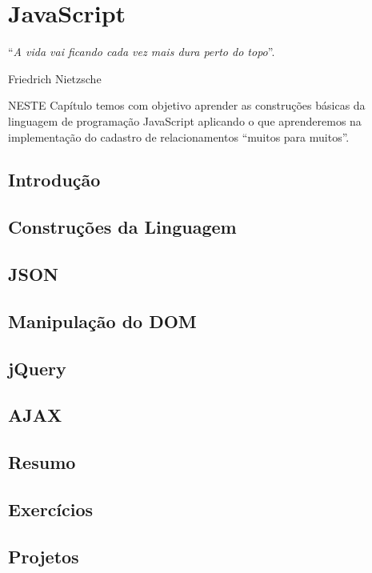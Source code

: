 \chapter{JavaScript}\label{cap:javaScript}
\epigraph{``\textit{A vida vai ficando cada vez mais dura perto do topo}''.}{Friedrich Nietzsche}

\lettrine[lines=4, lhang=0.1, lraise=0, loversize=0.2, findent=0.1em]{\textcolor{corAzulTema}{N}}{ESTE} Capítulo temos com objetivo aprender as construções básicas da linguagem de programação JavaScript aplicando o que aprenderemos na implementação do cadastro de relacionamentos ``muitos para muitos''.

\section{Introdução}

\section{Construções da Linguagem}

\section{JSON}

\section{Manipulação do DOM}

\section{jQuery}

\section{AJAX}

\section{Resumo}

\section{Exercícios}

\section{Projetos}
